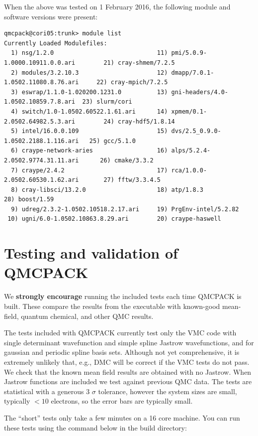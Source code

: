 When the above was tested on 1 February 2016, the following module and
software versions were present:

\begin{verbatim}
qmcpack@cori05:trunk> module list
Currently Loaded Modulefiles:
  1) nsg/1.2.0                             11) pmi/5.0.9-1.0000.10911.0.0.ari        21) cray-shmem/7.2.5
  2) modules/3.2.10.3                      12) dmapp/7.0.1-1.0502.11080.8.76.ari     22) cray-mpich/7.2.5
  3) eswrap/1.1.0-1.020200.1231.0          13) gni-headers/4.0-1.0502.10859.7.8.ari  23) slurm/cori
  4) switch/1.0-1.0502.60522.1.61.ari      14) xpmem/0.1-2.0502.64982.5.3.ari        24) cray-hdf5/1.8.14
  5) intel/16.0.0.109                      15) dvs/2.5_0.9.0-1.0502.2188.1.116.ari   25) gcc/5.1.0
  6) craype-network-aries                  16) alps/5.2.4-2.0502.9774.31.11.ari      26) cmake/3.3.2
  7) craype/2.4.2                          17) rca/1.0.0-2.0502.60530.1.62.ari       27) fftw/3.3.4.5
  8) cray-libsci/13.2.0                    18) atp/1.8.3                             28) boost/1.59
  9) udreg/2.3.2-1.0502.10518.2.17.ari     19) PrgEnv-intel/5.2.82
 10) ugni/6.0-1.0502.10863.8.29.ari        20) craype-haswell
\end{verbatim}

\section{Testing and validation of QMCPACK}
\label{sec:testing}
We \textbf{strongly encourage} running the included tests each time
QMCPACK is built. These compare the results from the executable with
known-good mean-field, quantum chemical, and other QMC results. 

The tests included with QMCPACK currently test only the VMC code with
single determinant wavefunction and simple spline Jastrow
wavefunctions, and for gaussian and periodic spline basis
sets. Although not yet comprehensive, it is extremely unlikely that,
e.g., DMC will be correct if the VMC tests do not pass.  We check that the known mean
field results are obtained with no Jastrow. When Jastrow functions are
included we test against previous QMC data. The tests are statistical
with a generous 3 $\sigma$ tolerance, however the system sizes are
small, typically $<10$ electrons, so the error bars are typically
small.

 The ``short'' tests only take a few minutes on a 16
core machine. You can run these tests using the command below in the
build directory:


